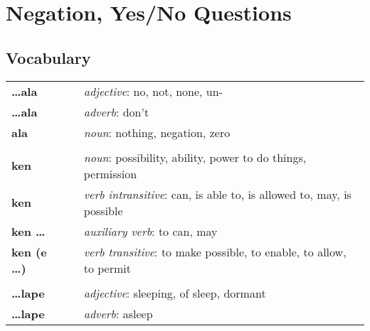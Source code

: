 \section{Negation, Yes/No Questions}
\subsection*{Vocabulary}
%
\begin{supertabular}{p{2,5cm}|ll}
    \textbf{\dots ala}      &  & \textit{adjective}: no, not, none, un-                                       \\ %
    \textbf{\dots ala}      &  & \textit{adverb}: don't                                                       \\ %
    \textbf{ala}            &  & \textit{noun}: nothing, negation, zero                                       \\ %
                            &  &                                                                              \\ %
    \textbf{ken}            &  & \textit{noun}: possibility, ability, power to do things, permission          \\ %
    \textbf{ken}            &  & \textit{verb intransitive}: can, is able to, is allowed to, may, is possible \\ %
    \textbf{ken \dots}      &  & \textit{auxiliary verb}: to can, may                                         \\ %
    \textbf{ken (e \dots)}  &  & \textit{verb transitive}: to make possible, to enable, to allow, to permit   \\ %
                            &  &                                                                              \\ %
    \textbf{\dots lape}     &  & \textit{adjective}: sleeping, of sleep, dormant                              \\ %
    \textbf{\dots lape}     &  & \textit{adverb}: asleep                                                      \\ %

\end{supertabular}
